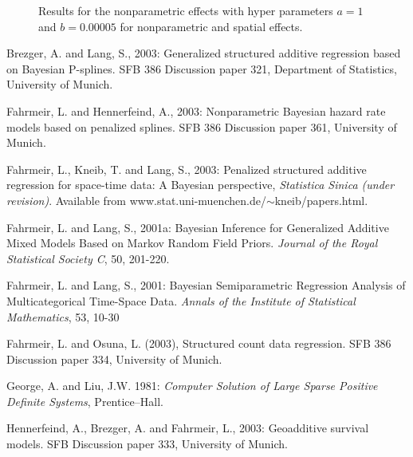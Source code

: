 \documentclass{article}
\begin{document}
\begin{figure}[ht]
\begin{center}
 {\it\caption{Results
for the nonparametric effects with hyper parameters $a=1$ and
$b=0.00005$ for nonparametric and spatial effects.\label{sensi3}}}
\end{center}
\end{figure}


\begin{thebibliography}{99}

 Brezger, A. and
Lang, S., 2003: Generalized structured additive regression based
on Bayesian P-splines. SFB 386 Discussion paper 321, Department of
Statistics, University of Munich.

 Fahrmeir,
L. and Hennerfeind, A., 2003: Nonparametric Bayesian hazard rate
models based on penalized splines. SFB 386 Discussion paper 361,
University of Munich.

 Fahrmeir, L., Kneib,
T. and Lang, S., 2003: Penalized structured additive regression
for space-time data: A Bayesian perspective, {\it Statistica
Sinica (under revision)}. Available from
www.stat.uni-muenchen.de/$\sim$kneib/papers.html.

 Fahrmeir, L. and
Lang, S., 2001a: Bayesian Inference for Generalized Additive Mixed
Models Based on Markov Random Field Priors. {\it Journal of the
Royal Statistical Society C}, 50, 201-220.

 Fahrmeir, L. and
Lang, S., 2001: Bayesian Semiparametric Regression Analysis of
Multicategorical Time-Space Data. {\it Annals of the Institute of
Statistical Mathematics}, 53, 10-30

 Fahrmeir, L. and
Osuna, L. (2003), Structured count data regression. SFB 386
Discussion paper 334, University of Munich.

 George, A. and Liu,
J.W. 1981: {\it Computer Solution of Large Sparse Positive
Definite Systems}, Prentice--Hall.

 Hennerfeind, A.,
Brezger, A. and Fahrmeir, L., 2003: Geoadditive survival models.
SFB Discussion paper 333, University of Munich.


\end{thebibliography}
\end{document}
